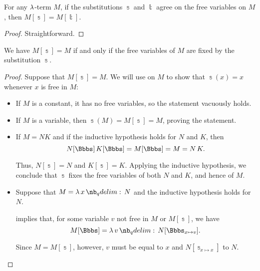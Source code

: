 \begin{proposition}\label{thm:lambda_substitution_restriction}
  For any \( \mathrm{\lambda} \)-term \( M \), if the substitutions \( \Bbbs \) and \( \Bbbt \) agree on the free variables on \( M \), then \( M[\Bbbs] = M[\Bbbt] \).
\end{proposition}
\begin{proof}
  Straightforward.
\end{proof}

\begin{proposition}\label{thm:lambda_substitution_noop}
  We have \( M[\Bbbs] = M \) if and only if the free variables of \( M \) are fixed by the substitution \( \Bbbs \).
\end{proposition}
\begin{proof}
  \SufficiencySubProof Suppose that \( M[\Bbbs] = M \). We will use  on \( M \) to show that \( \Bbbs(x) = x \) whenever \( x \) is free in \( M \):
  \begin{itemize}
    \item If \( M \) is a constant, it has no free variables, so the statement vacuously holds.
    \item If \( M \) is a variable, then \( \Bbbs(M) = M[\Bbbs] = M \), proving the statement.
    \item If \( M = NK \) and if the inductive hypothesis holds for \( N \) and \( K \), then
    \begin{equation*}
      N[\Bbbs] \thinspace K[\Bbbs]
      =
      M[\Bbbs]
      =
      M
      =
      N \thinspace K.
    \end{equation*}

    Thus, \( N[\Bbbs] = N \) and \( K[\Bbbs] = K \). Applying the inductive hypothesis, we conclude that \( \Bbbs \) fixes the free variables of both \( N \) and \( K \), and hence of \( M \).

    \item Suppose that \( M = \qabs x N \) and the inductive hypothesis holds for \( N \).

     implies that, for some variable \( v \) not free in \( M \) or \( M[\Bbbs] \), we have
    \begin{equation*}
      M[\Bbbs] = \qabs v N[\Bbbs_{x \mapsto v}].
    \end{equation*}

    Since \( M = M[\Bbbs] \), however, \( v \) must be equal to \( x \) and \( N[\Bbbs_{x \mapsto x}] \) to \( N \).


\end{itemize}
\end{proof}
